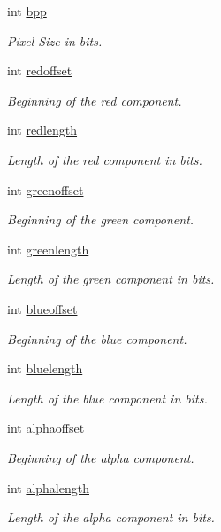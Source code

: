 \begin{DoxyCompactItemize}
\item 
int \hyperlink{structandroid_1_1PixelFormatDetail_a9b48c71237b9edee68ff1d7733ced1c0}{bpp}
\begin{DoxyCompactList}\small\item\em \-Pixel \-Size in bits. \end{DoxyCompactList}\item 
int \hyperlink{structandroid_1_1PixelFormatDetail_af6a4d67b216877b4b37db9ecef5a85a9}{redoffset}
\begin{DoxyCompactList}\small\item\em \-Beginning of the red component. \end{DoxyCompactList}\item 
int \hyperlink{structandroid_1_1PixelFormatDetail_ae6ec136dfd320bfee96a33c2fb1b1be1}{redlength}
\begin{DoxyCompactList}\small\item\em \-Length of the red component in bits. \end{DoxyCompactList}\item 
int \hyperlink{structandroid_1_1PixelFormatDetail_a298cf325578203cdae53f5339e43e846}{greenoffset}
\begin{DoxyCompactList}\small\item\em \-Beginning of the green component. \end{DoxyCompactList}\item 
int \hyperlink{structandroid_1_1PixelFormatDetail_ad36562dae6d3fc77c3b59e97965a2dcd}{greenlength}
\begin{DoxyCompactList}\small\item\em \-Length of the green component in bits. \end{DoxyCompactList}\item 
int \hyperlink{structandroid_1_1PixelFormatDetail_a8891e972a1badbcb7413733d32ae792b}{blueoffset}
\begin{DoxyCompactList}\small\item\em \-Beginning of the blue component. \end{DoxyCompactList}\item 
int \hyperlink{structandroid_1_1PixelFormatDetail_a47a3d74c3aef2f6731aecf8f118b5d45}{bluelength}
\begin{DoxyCompactList}\small\item\em \-Length of the blue component in bits. \end{DoxyCompactList}\item 
int \hyperlink{structandroid_1_1PixelFormatDetail_acd22e5fc60422d9eb58d6ca78a781916}{alphaoffset}
\begin{DoxyCompactList}\small\item\em \-Beginning of the alpha component. \end{DoxyCompactList}\item 
int \hyperlink{structandroid_1_1PixelFormatDetail_a4bb2ec069b84b7cf3abfd084bc23f483}{alphalength}
\begin{DoxyCompactList}\small\item\em \-Length of the alpha component in bits. \end{DoxyCompactList}\end{DoxyCompactItemize}
